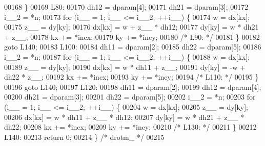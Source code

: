 \begin{DoxyCode}
00168     \}
00169 L80:
00170     dh12 = dparam[4];
00171     dh21 = dparam[3];
00172     i\_\_2 = *n;
00173     \textcolor{keywordflow}{for} (i\_\_ = 1; i\_\_ <= i\_\_2; ++i\_\_) \{
00174     w = dx[kx];
00175     z\_\_ = dy[ky];
00176     dx[kx] = w + z\_\_ * dh12;
00177     dy[ky] = w * dh21 + z\_\_;
00178     kx += *incx;
00179     ky += *incy;
00180 \textcolor{comment}{/* L90: */}
00181     \}
00182     \textcolor{keywordflow}{goto} L140;
00183 L100:
00184     dh11 = dparam[2];
00185     dh22 = dparam[5];
00186     i\_\_2 = *n;
00187     \textcolor{keywordflow}{for} (i\_\_ = 1; i\_\_ <= i\_\_2; ++i\_\_) \{
00188     w = dx[kx];
00189     z\_\_ = dy[ky];
00190     dx[kx] = w * dh11 + z\_\_;
00191     dy[ky] = -w + dh22 * z\_\_;
00192     kx += *incx;
00193     ky += *incy;
00194 \textcolor{comment}{/* L110: */}
00195     \}
00196     \textcolor{keywordflow}{goto} L140;
00197 L120:
00198     dh11 = dparam[2];
00199     dh12 = dparam[4];
00200     dh21 = dparam[3];
00201     dh22 = dparam[5];
00202     i\_\_2 = *n;
00203     \textcolor{keywordflow}{for} (i\_\_ = 1; i\_\_ <= i\_\_2; ++i\_\_) \{
00204     w = dx[kx];
00205     z\_\_ = dy[ky];
00206     dx[kx] = w * dh11 + z\_\_ * dh12;
00207     dy[ky] = w * dh21 + z\_\_ * dh22;
00208     kx += *incx;
00209     ky += *incy;
00210 \textcolor{comment}{/* L130: */}
00211     \}
00212 L140:
00213     \textcolor{keywordflow}{return} 0;
00214 \} \textcolor{comment}{/* drotm\_ */}
00215 
\end{DoxyCode}
